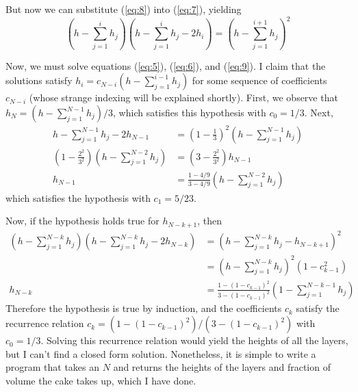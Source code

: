 \documentclass[12pt]{article}
\begin{document}
But now we can substitute (\ref{eq:8}) into (\ref{eq:7}), yielding
\begin{equation}
  \label{eq:9}
  \left( h - \sum_{j=1}^i h_j \right) \left( h - \sum_{j=1}^i h_j - 2h_i \right) = \left( h - \sum_{j=1}^{i+1}h_j \right)^2
\end{equation}

Now, we must solve equations (\ref{eq:5}), (\ref{eq:6}), and (\ref{eq:9}). I claim that the solutions satisfy $h_i = c_{N-i}(h - \sum_{j=1}^{i-1}h_j)$ for some sequence of coefficients $c_{N-i}$ (whose strange indexing will be explained shortly). First, we observe that $h_N = (h - \sum_{j=1}^{N-1}h_j)/3$, which satisfies this hypothesis with $c_0 = 1/3$. Next,
\begin{align*}
  h - \sum_{j=1}^{N-1}h_j - 2h_{N-1} &= \left( 1 - \frac{1}{3} \right)^2 \left( h - \sum_{j=1}^{N-1}h_j \right) \\
  \left( 1 - \frac{2^2}{3^2} \right)\left( h - \sum_{j=1}^{N-2}h_j \right) &= \left( 3 - \frac{2^2}{3^2} \right)h_{N-1}\\
  h_{N-1} &= \frac{1 - 4/9}{3-4/9} \left( h - \sum_{j=1}^{N-2}h_j \right)
\end{align*}
which satisfies the hypothesis with $c_1 = 5/23$.

Now, if the hypothesis holds true for $h_{N-k+1}$, then
\begin{align*}
  \left( h - \sum_{j=1}^{N-k}h_j \right) \left( h - \sum_{j=1}^{N-k}h_j - 2h_{N-k} \right) &= \left( h - \sum_{j=1}^{N-k}h_j - h_{N-k+1} \right)^2 \\
                                                                                           &= \left( h - \sum_{j=1}^{N-k}h_j \right)^2 \left( 1 - c_{k-1}^2 \right)\\
  h_{N-k} &= \frac{1 - (1-c_{k-1})^2}{3-(1-c_{k-1})^2}\left( 1 - \sum_{j=1}^{N-k-1}h_j \right)
\end{align*}
Therefore the hypothesis is true by induction, and the coefficients $c_k$ satisfy the recurrence relation $c_k = (1-(1-c_{k-1})^2)/(3-(1-c_{k-1})^2)$ with $c_0 = 1/3$. Solving this recurrence relation would yield the heights of all the layers, but I can't find a closed form solution. Nonetheless, it is simple to write a program that takes an $N$ and returns the heights of the layers and fraction of volume the cake takes up, which I have done.
\end{document}
